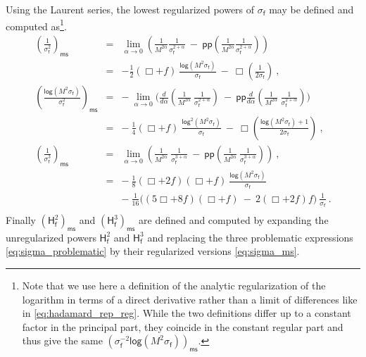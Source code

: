 \documentclass[11pt]{book}
\newcommand{\pp}{\mathsf{pp}}
\newcommand{\ms}{\mathsf{ms}}
\renewcommand{\log}{\mathsf{log}}
\newcommand{\Hsf}{\mathsf{H}}
\newcommand{\fsf}{\mathsf{f}}
\theoremstyle{break}
\begin{document}
Using the Laurent series, the lowest regularized powers of $\sigma_\fsf$ may be defined and computed as\footnote{Note that we use here a definition of the analytic regularization of the logarithm in terms of a direct derivative rather than a limit of differences like in \eqref{eq:hadamard_rep_reg}. While the two definitions differ up to a constant factor in the principal part, they coincide in the constant regular part and thus give the same $(\sigma^{-2}_\fsf \log(M^2 \sigma_\fsf))_\ms$.}. 
%
\begin{eqnarray}
\left(\frac{1}{\sigma_\fsf^2}\right)_\ms &=& \lim_{\alpha\to 0} \left(\frac{1}{M^{2\alpha}} \frac{1}{\sigma^{2+\alpha}_\fsf} \ - \ \pp\left(\frac{1}{M^{2\alpha}} \frac{1}{\sigma^{2+\alpha}_\fsf}\right)\right) \nonumber \\
&=& - \frac12 (\Box+f) \ \frac{\log \left(M^2 \sigma_\fsf\right)}{\sigma_\fsf} \ - \ \Box\left(\frac{1}{2\sigma_\fsf}\right) \ , \nonumber \\
%
\left(\frac{\log\left(M^2\sigma_\fsf\right)}{\sigma_\fsf^2}\right)_\ms &=& - \ \lim_{\alpha\to 0} \Bigg( \frac{d}{d\alpha}\left(\frac{1}{M^{2\alpha}} \ \frac{1}{\sigma^{2+\alpha}_\fsf}\right) \ - \ \pp\frac{d}{d\alpha} \left( \frac{1}{M^{2\alpha}} \ \frac{1}{\sigma^{2+\alpha}_\fsf}\right) \Bigg) \nonumber \\ 
&=& - \ \frac14 \left(\Box+f\right) \ \frac{\log^2\left(M^2 \sigma_\fsf\right)}{\sigma_\fsf} \ - \ \Box\left(\frac{\log \left(M^2 \sigma_\fsf\right)+1}{2\sigma_\fsf}\right) \ , \nonumber \\
%
\left(\frac{1}{\sigma_\fsf^3}\right)_\ms &=& \lim_{\alpha\to 0} \left( \frac{1}{M^{2\alpha}} \ \frac{1}{\sigma^{3+\alpha}_\fsf} \ - \ \pp\left(\frac{1}{M^{2\alpha}} \ \frac{1}{\sigma^{3+\alpha}_\fsf} \right)\right) \ , \nonumber \\
&=& - \ \frac18 (\Box+2f) (\Box+f) \ \frac{\log\left(M^2 \sigma_\fsf\right)}{\sigma_\fsf} \nonumber \\ 
&& - \ \frac{1}{16} \bigg( (5\Box+8f)(\Box+f) \ - \ 2(\Box+2f)f \bigg) \ \frac{1}{\sigma_\fsf} \ . \nonumber \\
\label{eq:sigma_ms}
\end{eqnarray}
%
Finally $\left(\Hsf^2_\fsf\right)_\ms$ and $\left(\Hsf^3_\fsf\right)_\ms$ are defined and computed by expanding the unregularized powers $\Hsf^2_\fsf$ and $\Hsf^3_\fsf$ and replacing the three problematic expressions \eqref{eq:sigma_problematic} by their regularized versions \eqref{eq:sigma_ms}.


\end{document}
